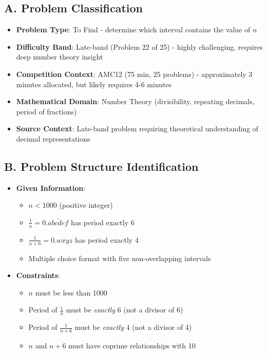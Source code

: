 \documentclass[11pt]{article}
\begin{document}
\begin{problemconfigbox}
\subsection*{A. Problem Classification}
\begin{itemize}[leftmargin=*]
    \item \textbf{Problem Type}: To Find - determine which interval contains the value of $n$
    \item \textbf{Difficulty Band}: Late-band (Problem 22 of 25) - highly challenging, requires deep number theory insight
    \item \textbf{Competition Context}: AMC12 (75 min, 25 problems) - approximately 3 minutes allocated, but likely requires 4-6 minutes
    \item \textbf{Mathematical Domain}: Number Theory (divisibility, repeating decimals, period of fractions)
    \item \textbf{Source Context}: Late-band problem requiring theoretical understanding of decimal representations
\end{itemize}

\subsection*{B. Problem Structure Identification}
\begin{itemize}[leftmargin=*]
    \item \textbf{Given Information}: 
    \begin{itemize}
        \item $n < 1000$ (positive integer)
        \item $\frac{1}{n} = 0.\overline{abcdef}$ has period exactly 6
        \item $\frac{1}{n+6} = 0.\overline{wxyz}$ has period exactly 4
        \item Multiple choice format with five non-overlapping intervals
    \end{itemize}
    
    \item \textbf{Constraints}: 
    \begin{itemize}
        \item $n$ must be less than 1000
        \item Period of $\frac{1}{n}$ must be \textit{exactly} 6 (not a divisor of 6)
        \item Period of $\frac{1}{n+6}$ must be \textit{exactly} 4 (not a divisor of 4)
        \item $n$ and $n+6$ must have coprime relationships with 10
    \end{itemize}
    

\end{itemize}
\end{problemconfigbox}
\end{document}
